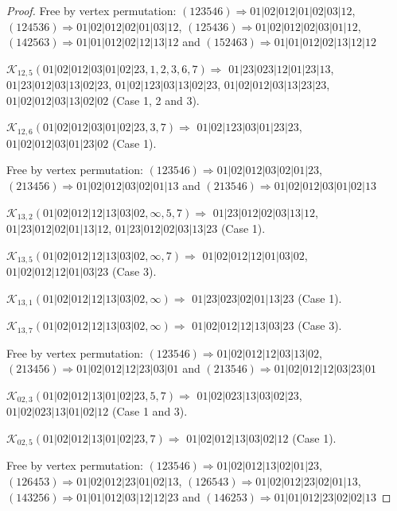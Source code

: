 \documentclass[12pt]{article}
\theoremstyle{plain}
\theoremstyle{definition}
\theoremstyle{remark}
\newcommand{\fancy}[1]{\mathcal{#1}}
\def\K{\fancy{K}}
\begin{document}
\begin{proof}
	
	
	Free by vertex permutation: $(1 2 3 5 4 6)\Rightarrow 01|02|012|01|02|03|12$, $(1 2 4 5 3 6)\Rightarrow 01|02|012|02|01|03|12$, $(1 2 5 4 3 6)\Rightarrow 01|02|012|02|03|01|12$, $(1 4 2 5 6 3)\Rightarrow 01|01|012|02|12|13|12$ and $(1 5 2 4 6 3)\Rightarrow 01|01|012|02|13|12|12$
	
	
	
	\bigskip
	
	$\K_{12,5}(01|02|012|03|01|02|23,1, 2, 3, 6, 7)\Rightarrow $ $01|23|023|12|01|23|13$, $01|23|012|03|13|02|23$, $01|02|123|03|13|02|23$, $01|02|012|03|13|23|23$, $01|02|012|03|13|02|02$ (Case 1, 2 and 3).
	
	$\K_{12,6}(01|02|012|03|01|02|23,3, 7)\Rightarrow $ $01|02|123|03|01|23|23$, $01|02|012|03|01|23|02$ (Case 1).
	
	
	
	Free by vertex permutation: $(1 2 3 5 4 6)\Rightarrow 01|02|012|03|02|01|23$, $(2 1 3 4 5 6)\Rightarrow 01|02|012|03|02|01|13$ and $(2 1 3 5 4 6)\Rightarrow 01|02|012|03|01|02|13$
	
	
	
	\bigskip
	
	$\K_{13,2}(01|02|012|12|13|03|02,\infty,5, 7)\Rightarrow $ $01|23|012|02|03|13|12$, $01|23|012|02|01|13|12$, $01|23|012|02|03|13|23$ (Case 1).
	
	$\K_{13,5}(01|02|012|12|13|03|02,\infty,7)\Rightarrow $ $01|02|012|12|01|03|02$, $01|02|012|12|01|03|23$ (Case 3).
	
	$\K_{13,1}(01|02|012|12|13|03|02,\infty)\Rightarrow $ $01|23|023|02|01|13|23$ (Case 1).
	
	$\K_{13,7}(01|02|012|12|13|03|02,\infty)\Rightarrow $ $01|02|012|12|13|03|23$ (Case 3).
	
	
	
	Free by vertex permutation: $(1 2 3 5 4 6)\Rightarrow 01|02|012|12|03|13|02$, $(2 1 3 4 5 6)\Rightarrow 01|02|012|12|23|03|01$ and $(2 1 3 5 4 6)\Rightarrow 01|02|012|12|03|23|01$
	
	
	
	\bigskip
	
	$\K_{02,3}(01|02|012|13|01|02|23,5, 7)\Rightarrow $ $01|02|023|13|03|02|23$, $01|02|023|13|01|02|12$ (Case 1 and 3).
	
	$\K_{02,5}(01|02|012|13|01|02|23,7)\Rightarrow $ $01|02|012|13|03|02|12$ (Case 1).
	
	
	
	Free by vertex permutation: $(1 2 3 5 4 6)\Rightarrow 01|02|012|13|02|01|23$, $(1 2 6 4 5 3)\Rightarrow 01|02|012|23|01|02|13$, $(1 2 6 5 4 3)\Rightarrow 01|02|012|23|02|01|13$, $(1 4 3 2 5 6)\Rightarrow 01|01|012|03|12|12|23$ and $(1 4 6 2 5 3)\Rightarrow 01|01|012|23|02|02|13$
	

\end{proof}
\end{document}

